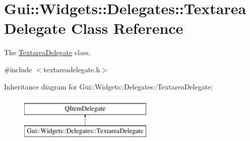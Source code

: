 \hypertarget{classGui_1_1Widgets_1_1Delegates_1_1TextareaDelegate}{}\section{Gui\+:\+:Widgets\+:\+:Delegates\+:\+:Textarea\+Delegate Class Reference}
\label{classGui_1_1Widgets_1_1Delegates_1_1TextareaDelegate}


The \hyperlink{classGui_1_1Widgets_1_1Delegates_1_1TextareaDelegate}{Textarea\+Delegate} class.  




{\ttfamily \#include $<$textareadelegate.\+h$>$}

Inheritance diagram for Gui\+:\+:Widgets\+:\+:Delegates\+:\+:Textarea\+Delegate\+:\begin{figure}[H]
\begin{center}
\leavevmode
\includegraphics[height=2.000000cm]{df/d9e/classGui_1_1Widgets_1_1Delegates_1_1TextareaDelegate}
\end{center}
\end{figure}
